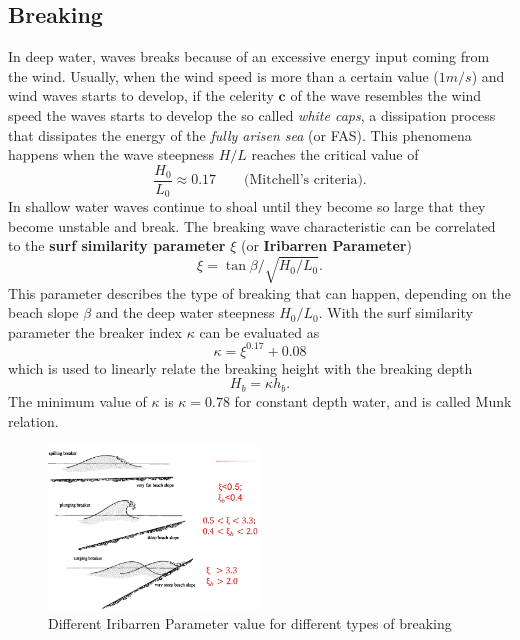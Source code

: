 \subsection{Breaking}\label{Breaking}
In deep water, waves breaks because of an excessive energy input coming from the wind. Usually, when the wind speed is more than a certain value ($1m/s$) and wind waves starts to develop, if the celerity $\mathbf{c}$ of the wave resembles the wind speed the waves starts to develop the so called \textit{white caps}, a dissipation process that dissipates the energy of the \textit{fully arisen sea} (or FAS). This phenomena happens when the wave steepness $H/L$ reaches the critical value of
\begin{equation}
\dfrac{H_{0}}{L_{0}}\approx 0.17 \qquad \text{(Mitchell's criteria)}.
\end{equation}
In shallow water waves continue to shoal until they become so large that they become unstable and break. The breaking wave characteristic can be correlated to the \textbf{surf similarity parameter} $\xi$ (or \textbf{Iribarren Parameter})
\begin{equation}
\xi = \tan\beta/\sqrt{H_{0}/L_{0}}.
\end{equation}
This parameter describes the type of breaking that can happen, depending on the beach slope $\beta$ and the deep water steepness $H_{0}/L_{0}$. With the surf similarity parameter the breaker index $\kappa$ can be evaluated as 
\begin{equation}
\kappa=\xi^{0.17}+0.08
\end{equation}
which is used to linearly relate the breaking height with the breaking depth
\begin{equation}
H_{b}=\kappa h_{b}.
\end{equation}
The minimum value of $\kappa$ is $\kappa=0.78$ for constant depth water, and is called Munk relation.
\begin{figure}
\centering
\includegraphics[width=0.5\textwidth]{./SurfWaves_figs/breaker_types.png} 
\caption{Different Iribarren Parameter value for different types of breaking}
\end{figure}
